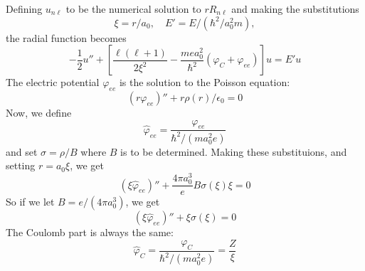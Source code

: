 \documentclass[twocolumn]{article}
\begin{document}
\begin{large}
Defining $u_{n\ell}$ to be the numerical solution to $rR_{n\ell}$ and making the substitutions
\begin{equation}
    \xi = r/a_0,\quad E' = E/(\hbar^2/a_0^2m),
\end{equation}
the radial function becomes
\begin{equation}
    -\frac{1}{2}u'' + \left[\frac{\ell(\ell+1)}{2\xi^2}-\frac{mea_0^2}{\hbar^2}(\varphi_C+\varphi_{ee})\right]u = E'u
\end{equation}
The electric potential $\varphi_{ee}$ is the solution to the Poisson equation:
\begin{equation}
    (r\varphi_{ee})'' + r\rho(r)/\epsilon_0 = 0
\end{equation}
Now, we define 
\begin{equation}
    \hat{\varphi}_{ee} = \frac{\varphi_{ee}}{\hbar^2/(ma_0^2e)}
\end{equation}
and set $\sigma = \rho/B$ where $B$ is to be determined. Making these substituions, and setting $r=a_0\xi$, we get
\begin{equation}
    (\xi\hat{\varphi}_{ee})'' + \frac{4\pi a_0^3}{e}B\sigma(\xi)\xi = 0
\end{equation}
So if we let $B=e/(4\pi a_0^3)$, we get 
\begin{equation}
    (\xi\hat{\varphi}_{ee})'' + \xi\sigma(\xi) = 0
\end{equation}
The Coulomb part is always the same:
\begin{equation}
    \hat{\varphi}_C = \frac{\varphi_C}{\hbar^2/(ma_0^2e)} = \frac{Z}{\xi}
\end{equation}




\end{large}
\end{document}
